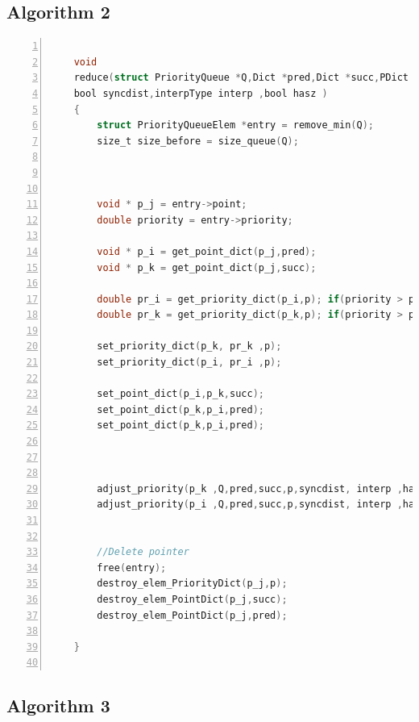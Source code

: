 \documentclass[twoside,12pt, a4paper]{report}
\begin{document}
\subsection{Algorithm 2}
\begin{lstlisting}[language=C, % Spécifie le langage du code
	caption={reduce}, % Légende du listing
	label=lst:reduce_c, % Étiquette pour référencer le listing
	numbers=left, 
	numberstyle=\tiny\color{gray}, 
	stepnumber=1, 
	frame=single,
	breaklines=true, 
	postbreak=\mbox{\textcolor{red}{$\hookrightarrow$}\space},
	showstringspaces=false 
	]
	
	void
	reduce(struct PriorityQueue *Q,Dict *pred,Dict *succ,PDict  *p,
	bool syncdist,interpType interp ,bool hasz )
	{
		struct PriorityQueueElem *entry = remove_min(Q);
		size_t size_before = size_queue(Q);
		
		
		
		void * p_j = entry->point;
		double priority = entry->priority;
		
		void * p_i = get_point_dict(p_j,pred);
		void * p_k = get_point_dict(p_j,succ);
		
		double pr_i = get_priority_dict(p_i,p); if(priority > pr_i){ pr_i = priority; }
		double pr_k = get_priority_dict(p_k,p); if(priority > pr_k){ pr_k = priority; }
		
		set_priority_dict(p_k, pr_k ,p);
		set_priority_dict(p_i, pr_i ,p);
		
		set_point_dict(p_i,p_k,succ);
		set_point_dict(p_k,p_i,pred);
		set_point_dict(p_k,p_i,pred);
		
		
		
		adjust_priority(p_k ,Q,pred,succ,p,syncdist, interp ,hasz );
		adjust_priority(p_i ,Q,pred,succ,p,syncdist, interp ,hasz );
		
		
		//Delete pointer
		free(entry);
		destroy_elem_PriorityDict(p_j,p);
		destroy_elem_PointDict(p_j,succ);
		destroy_elem_PointDict(p_j,pred);
		
	}
	
\end{lstlisting}

\subsection{Algorithm 3}
\end{document}

